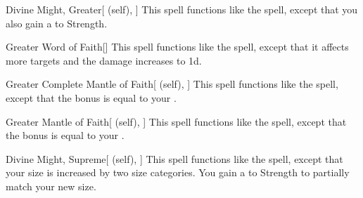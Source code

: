 \lowercase{\hypertarget{spell:Divine Might, Greater}{}}\label{spell:Divine Might, Greater}
\begin{attuneability}[Rank 6]{\hypertarget{spell:Divine Might, Greater}{Divine Might, Greater}}[ (self), ]
This spell functions like the  spell, except that you also gain a   to Strength.
\end{attuneability}
\vspace{0.25em}



\lowercase{\hypertarget{spell:Greater Word of Faith}{}}\label{spell:Greater Word of Faith}
\begin{freeability}[Rank 6]{\hypertarget{spell:Greater Word of Faith}{Greater Word of Faith}}[]
This spell functions like the  spell, except that it affects more targets and the damage increases to  \plus1d.
\end{freeability}
\vspace{0.25em}



\lowercase{\hypertarget{spell:Greater Complete Mantle of Faith}{}}\label{spell:Greater Complete Mantle of Faith}
\begin{attuneability}[Rank 7]{\hypertarget{spell:Greater Complete Mantle of Faith}{Greater Complete Mantle of Faith}}[ (self), ]
This spell functions like the  spell, except that the bonus is equal to your .
\end{attuneability}
\vspace{0.25em}



\lowercase{\hypertarget{spell:Greater Mantle of Faith}{}}\label{spell:Greater Mantle of Faith}
\begin{attuneability}[Rank 7]{\hypertarget{spell:Greater Mantle of Faith}{Greater Mantle of Faith}}[ (self), ]
This spell functions like the  spell, except that the bonus is equal to your .
\end{attuneability}
\vspace{0.25em}



\lowercase{\hypertarget{spell:Divine Might, Supreme}{}}\label{spell:Divine Might, Supreme}
\begin{attuneability}[Rank 8]{\hypertarget{spell:Divine Might, Supreme}{Divine Might, Supreme}}[ (self), ]
This spell functions like the  spell, except that your size is increased by two size categories.
You gain a   to Strength to partially match your new size.
\end{attuneability}
\vspace{0.25em}



